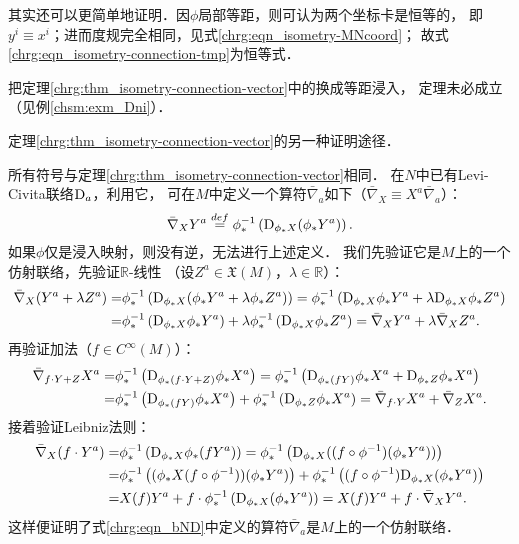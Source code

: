 \begin{remark}
    其实还可以更简单地证明．因$\phi$局部等距，则可认为两个坐标卡是恒等的，
    即$y^i\equiv x^i$；进而度规完全相同，见式\eqref{chrg:eqn_isometry-MNcoord}；
    故式\eqref{chrg:eqn_isometry-connection-tmp}为恒等式．
\end{remark}

\begin{remark}
    把定理\ref{chrg:thm_isometry-connection-vector}中的换成等距浸入，
    定理未必成立（见例\ref{chsm:exm_Dni}）．
\end{remark}

\begin{example}
	定理\ref{chrg:thm_isometry-connection-vector}的另一种证明途径．
\end{example}
所有符号与定理\ref{chrg:thm_isometry-connection-vector}相同．
在$N$中已有Levi-Civita联络${\rm D}_a$，利用它，
可在$M$中定义一个算符$\bar{\nabla}_a$如下（$\bar{\nabla}_X \equiv X^a\bar{\nabla}_a $）：
\begin{equation}\label{chrg:eqn_bND}
	\bar{\nabla}_X Y^a \overset{def}{=} \phi^{-1}_* \left( {\rm D}_{\phi_* X} (\phi_*Y^a) \right).
\end{equation}
如果$\phi$仅是浸入映射，则没有逆，无法进行上述定义．
我们先验证它是$M$上的一个仿射联络，先验证$\mathbb{R}$-线性
（设$Z^a \in \mathfrak{X}(M)$，$\lambda \in \mathbb{R}$）：
\begin{align*}
	\bar{\nabla}_X (Y^a + \lambda Z^a) =& \phi^{-1}_* \left( {\rm D}_{\phi_* X} (\phi_*Y^a +\lambda \phi_*Z^a)\right)
	= \phi^{-1}_* \left( {\rm D}_{\phi_* X}\phi_*Y^a +\lambda  {\rm D}_{\phi_* X} \phi_*Z^a\right)\\
	=& \phi^{-1}_* \left( {\rm D}_{\phi_* X}\phi_*Y^a\right) +\lambda  \phi^{-1}_* \left({\rm D}_{\phi_* X} \phi_*Z^a\right)
	=  \bar{\nabla}_X Y^a  + \lambda  \bar{\nabla}_X Z^a .
\end{align*}
再验证加法（$f\in C^\infty(M)$）：
\begin{align*}
	\bar{\nabla}_{f\cdot Y + Z} X^a =& \phi^{-1}_* \left( {\rm D}_{\phi_* (f\cdot Y+Z)} \phi_*X^a\right)
	=\phi^{-1}_* \left( {\rm D}_{\phi_* (f Y)} \phi_*X^a+ {\rm D}_{\phi_*Z} \phi_*X^a\right)\\
	=&\phi^{-1}_* \left( {\rm D}_{\phi_* (f Y)} \phi_*X^a\right)+\phi^{-1}_* \left( {\rm D}_{\phi_*Z} \phi_*X^a\right)
	=   \bar{\nabla}_{f\cdot Y } X^a  +\bar{\nabla}_{ Z} X^a .
\end{align*}
接着验证Leibniz法则：
\begin{align*}
	\bar{\nabla}_X (f\cdot Y^a ) =& \phi^{-1}_* \left( {\rm D}_{\phi_* X} \phi_* (fY^a) \right)
	= \phi^{-1}_* \left( {\rm D}_{\phi_* X} ((f\circ \phi^{-1})(\phi_* Y^a) )\right) \\
	=& \phi^{-1}_* \left(({\phi_* X} (f\circ \phi^{-1})) (\phi_* Y^a)\right) + 
	\phi^{-1}_* \left((f\circ \phi^{-1}) {\rm D}_{\phi_* X} (\phi_* Y^a )\right)  \\
	=& X(f) Y^a  +   f\cdot \phi^{-1}_* \left({\rm D}_{\phi_* X} (\phi_* Y^a )\right)  
	= X(f) Y^a  +   f\cdot \bar{\nabla}_X Y^a  . 
\end{align*}
这样便证明了式\eqref{chrg:eqn_bND}中定义的算符$\bar{\nabla}_a$是$M$上的一个仿射联络．

